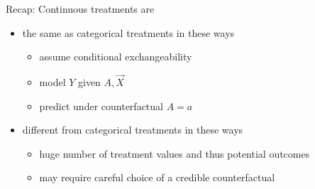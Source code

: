 \documentclass{beamer}
\begin{document}
\begin{frame}{Recap: Continuous treatments are}

\begin{itemize}
\item the same as categorical treatments in these ways
\begin{itemize}
\item assume conditional exchangeability
\item model $Y$ given $A,\vec{X}$
\item predict under counterfactual $A = a$
\end{itemize}
\item different from categorical treatments in these ways
\begin{itemize}
\item huge number of treatment values and thus potential outcomes
\item may require careful choice of a credible counterfactual
\end{itemize}
\end{itemize}
\end{frame}
\end{document}
